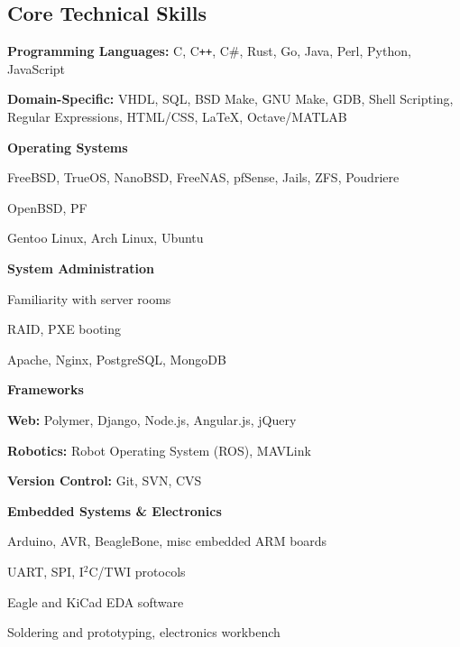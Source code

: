 \documentclass[10pt,letterpaper]{article}
\begin{document}
\subsection*{Core Technical Skills}
\begin{itemize*}
    \item \textbf{Programming Languages:} C, C\texttt{++}, C\#, Rust, Go, Java,
            Perl, Python, JavaScript
    \item \textbf{Domain-Specific:} VHDL, SQL, BSD Make, GNU Make, GDB, Shell
            Scripting, Regular Expressions, HTML/CSS, \LaTeX, Octave/MATLAB
    \item \textbf{Operating Systems}
        \begin{itemize*}
            \item FreeBSD, TrueOS, NanoBSD, FreeNAS, pfSense, Jails, ZFS, Poudriere
            \item OpenBSD, PF
            \item Gentoo Linux, Arch Linux, Ubuntu
        \end{itemize*}
    \item \textbf{System Administration}
        \begin{itemize*}
            \item Familiarity with server rooms
            \item RAID, PXE booting
            \item Apache, Nginx, PostgreSQL, MongoDB
        \end{itemize*}
    \item \textbf{Frameworks}
        \begin{itemize*}
            \item \textbf{Web:} Polymer, Django, Node.js, Angular.js, jQuery
            \item \textbf{Robotics:} Robot Operating System (ROS), MAVLink
            \item \textbf{Version Control:} Git, SVN, CVS
        \end{itemize*}
    \item \textbf{Embedded Systems \& Electronics}
        \begin{itemize*}
            \item Arduino, AVR, BeagleBone, misc embedded ARM boards
            \item UART, SPI, I$^2$C/TWI protocols
            \item Eagle and KiCad EDA software
            \item Soldering and prototyping, electronics workbench

\end{itemize*}
\end{itemize*}
\end{document}
